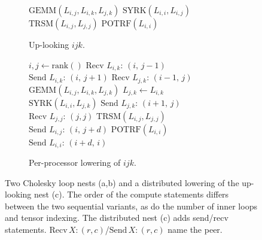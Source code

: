\documentclass[sigplan, nonacm]{acmart}
\newenvironment{codepanel}{%
  \begin{lrbox}{\codepanelbox}%
  \begin{minipage}{\dimexpr\linewidth-8pt\relax}%
}{%
  \end{minipage}%
  \end{lrbox}%
  \setlength{\fboxsep}{4pt}%
  \colorbox{codebg}{\usebox{\codepanelbox}}%
}
\begin{document}
\begin{figure}[t]
\begin{minipage}[t]{0.49\linewidth}
\begin{subfigure}[t]{\linewidth}
\centering
\scriptsize
\begin{codepanel}
\begin{algorithmic}
            \State $\text{GEMM}(L_{i,j}, L_{i,k}, L_{j,k})$
        \EndFor
        \State $\text{SYRK}(L_{i,i}, L_{i,j})$
        \State $\text{TRSM}(L_{i,j}, L_{j,j})$
    \EndFor
    \State $\text{POTRF}(L_{i,i})$
\EndFor
\end{algorithmic}
\end{codepanel}
\caption{Up-looking $ijk$.}
\label{fig:chol-ijk}
\end{subfigure}
\end{minipage}\hfill
\begin{minipage}[t]{0.49\linewidth}
\vspace*{0pt}
\begin{subfigure}[t]{\linewidth}
\centering
\scriptsize
\begin{codepanel}
\begin{algorithmic}
\State $i,j \leftarrow \text{rank}()$
        \State $\text{Recv } L_{i,k}\text{: }(i,\, j{-}1)$
        \State $\text{Send } L_{i,k}\text{: }(i,\, j{+}1)$
            \State $\text{Recv } L_{j,k}\text{: }(i{-}1,\, j)$
            \State $\text{GEMM}(L_{i,j}, L_{i,k}, L_{j,k})$
        \Else
            \State $L_{j,k} \leftarrow L_{i,k}$
            \State $\text{SYRK}(L_{i,i}, L_{j,k})$
        \EndIf
        \State $\text{Send } L_{j,k}\text{: }(i{+}1,\, j)$
    \EndIf
        \State $\text{Recv } L_{j,j}\text{: }(j,j)$
        \State $\text{TRSM}(L_{i,j}, L_{j,j})$
            \State $\text{Send } L_{i,j}\text{: }(i,\, j{+}d)$
        \EndFor
    \EndIf
        \State $\text{POTRF}(L_{i,i})$
            \State $\text{Send } L_{i,i}\text{: }(i{+}d,\, i)$
        \EndFor
    \EndIf
\EndFor
\end{algorithmic}
\end{codepanel}
\caption{Per-processor lowering of $ijk$.}
\label{fig:chol-lowering}
\end{subfigure}
\end{minipage}

\caption{Two Cholesky loop nests (a,b) and a distributed lowering of the
up-looking nest (c). The order of the compute statements differs between the
two sequential variants, as do the number of inner loops and tensor indexing. The 
distributed nest (c) adds send/recv statements. $\text{Recv}\,X\text{:}\,(r,c)$/$\text{Send}\,X\text{:}\,(r,c)$ name
the peer.}
\label{tab:cholesky_variants}
\end{figure}
\end{document}

